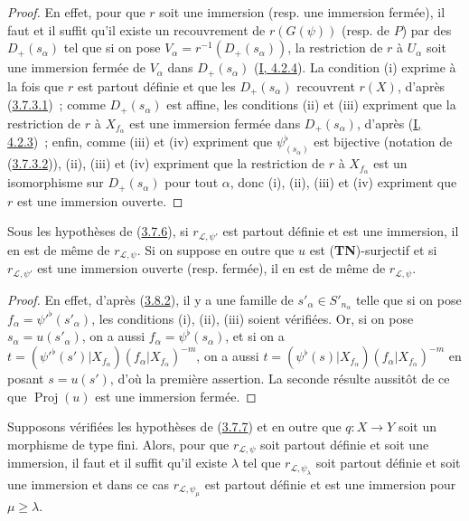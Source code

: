 \begin{proof}
En effet, pour que $r$ soit une immersion (resp. une immersion fermée), il
faut et il suffit qu'il existe un recouvrement de $r(G(\psi))$ (resp. de
$P$) par des $D_+(s_\alpha)$ tel que si on pose
$V_\alpha=r^{-1}(D_+(s_\alpha))$, la restriction de $r$ à $U_\alpha$ soit
une immersion fermée de $V_\alpha$ dans $D_+(s_\alpha)$
(\hyperref[I.4.2.4-fr]{I, 4.2.4}). La condition (i) exprime à la fois que
$r$ est partout définie et que les $D_+(s_\alpha)$ recouvrent $r(X)$,
d'après (\hyperref[II.3.7.3.1-fr]{3.7.3.1})~; comme $D_+(s_\alpha)$ est
affine, les conditions (ii) et (iii) expriment que la restriction de $r$ à
$X_{f_\alpha}$ est une immersion fermée dans $D_+(s_\alpha)$, d'après
(\hyperref[I.4.2.3-fr]{I, 4.2.3})~; enfin, comme (iii) et (iv) expriment que
$\psi_{(s_\alpha)}^\flat$ est bijective (notation de
(\hyperref[II.3.7.3.2-fr]{3.7.3.2})), (ii), (iii) et (iv) expriment que la
restriction de $r$ à $X_{f_\alpha}$ est un isomorphisme sur
$D_+(s_\alpha)$ pour tout $\alpha$, donc (i), (ii), (iii) et (iv) expriment
que $r$ est une immersion ouverte.
\end{proof}

\begin{corollary}[3.8.3]
\label{II.3.8.3-fr}
Sous les hypothèses de (\hyperref[II.3.7.6-fr]{3.7.6}), si
$r_{\mathcal{L},\psi'}$ est partout définie et est une immersion, il en est
de même de $r_{\mathcal{L},\psi}$. Si on suppose en outre que $u$ est
(\textbf{TN})-surjectif et si $r_{\mathcal{L},\psi'}$ est une immersion
ouverte (resp. fermée), il en est de même de $r_{\mathcal{L},\psi}$.
\end{corollary}

\begin{proof}
En effet, d'après (\hyperref[II.3.8.2-fr]{3.8.2}), il y a une famille de
$s'_\alpha\in S'_{n_\alpha}$ telle que si on pose
$f_\alpha=\psi'^\flat(s'_\alpha)$, les conditions (i), (ii), (iii) soient
vérifiées. Or, si on pose $s_\alpha=u(s'_\alpha)$, on a aussi
$f_\alpha=\psi^\flat(s_\alpha)$, et si on a
$t=(\psi'^\flat(s')|X_{f_\alpha})(f_\alpha|X_{f_\alpha})^{-m}$, on a aussi
$t=(\psi^\flat(s)|X_{f_\alpha})(f_\alpha|X_{f_\alpha})^{-m}$ en posant
$s=u(s')$, d'où la première assertion. La seconde résulte aussitôt de ce que
$\operatorname{Proj}(u)$ est une immersion fermée.
\end{proof}

\begin{proposition}[3.8.4]
\label{II.3.8.4-fr}
Supposons vérifiées les hypothèses de
(\hyperref[II.3.7.7-fr]{3.7.7}) et en outre que $q:X\to Y$ soit un morphisme
de type fini. Alors, pour que $r_{\mathcal{L},\psi}$ soit partout définie et
soit une immersion, il faut et il suffit qu'il existe $\lambda$ tel que
$r_{\mathcal{L},\psi_\lambda}$ soit partout définie et soit une immersion et
dans ce cas $r_{\mathcal{L},\psi_\mu}$ est partout définie et est une
immersion pour $\mu\geq\lambda$.
\end{proposition}

